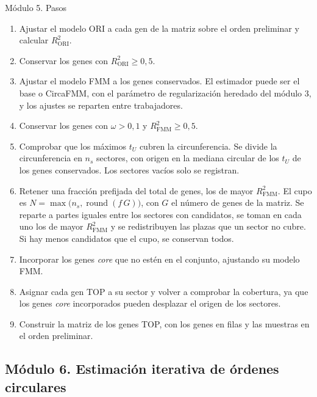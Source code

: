\documentclass[12pt, a4paper]{report}
\newcommand{\nuevo}[1]{\textcolor{cnuevo}{#1}}
\newenvironment{pasos}{\begin{enumerate}[nosep,leftmargin=1.5em,label=\arabic*.]}{\end{enumerate}}
\begin{document}
\begin{panel}{Módulo 5. Pasos}
\begin{pasos}
\item Ajustar el modelo ORI a cada gen de la matriz sobre el orden preliminar y calcular \(R^2_{\mathrm{ORI}}\).
\item Conservar los genes con \(R^2_{\mathrm{ORI}}\geq 0{,}5\).
\item Ajustar el modelo FMM a los genes conservados. \nuevo{El estimador puede ser el base o CircaFMM, con el parámetro de regularización heredado del módulo 3, y los ajustes se reparten entre trabajadores.}
\item Conservar los genes con \(\omega>0{,}1\) y \(R^2_{\mathrm{FMM}}\geq 0{,}5\).
\item Comprobar que los máximos \(t_U\) cubren la circunferencia. \nuevo{Se divide la circunferencia en \(n_s\) sectores, con origen en la mediana circular de los \(t_U\) de los genes conservados. Los sectores vacíos solo se registran.}
\item Retener una fracción prefijada del total de genes, los de mayor \(R^2_{\mathrm{FMM}}\). \nuevo{El cupo es \(N=\max\bigl(n_s,\operatorname{round}(f\,G)\bigr)\), con \(G\) el número de genes de la matriz. Se reparte a partes iguales entre los sectores con candidatos, se toman en cada uno los de mayor \(R^2_{\mathrm{FMM}}\) y se redistribuyen las plazas que un sector no cubre. Si hay menos candidatos que el cupo, se conservan todos.}
\item Incorporar los genes \textit{core} que no estén en el conjunto, ajustando su modelo FMM.
\item \nuevo{Asignar cada gen TOP a su sector y volver a comprobar la cobertura, ya que los genes \textit{core} incorporados pueden desplazar el origen de los sectores.}
\item Construir la matriz de los genes TOP, con los genes en filas y las muestras en el orden preliminar.
\end{pasos}
\end{panel}

\subsection{Módulo 6. Estimación iterativa de órdenes circulares}
\end{document}
